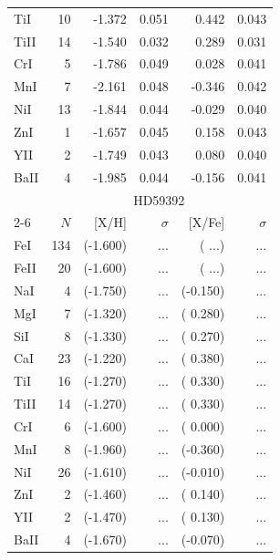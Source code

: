 \documentclass{aa}
\begin{document}
\begin{table}
\begin{tabular}{l*{5}{r}}
TiI  &     10&    -1.372&     0.051&     0.442&     0.043\\
TiII &     14&    -1.540&     0.032&     0.289&     0.031\\
CrI  &      5&    -1.786&     0.049&     0.028&     0.041\\
MnI  &      7&    -2.161&     0.048&    -0.346&     0.042\\
NiI  &     13&    -1.844&     0.044&    -0.029&     0.040\\
ZnI  &      1&    -1.657&     0.045&     0.158&     0.043\\
YII  &      2&    -1.749&     0.043&     0.080&     0.040\\
BaII &      4&    -1.985&     0.044&    -0.156&     0.041\\\hline\hline
     &                     \multicolumn{5}{c}{HD59392   }\\\cline{2-6}
     & $N$ & [{X}/{H}] & $\sigma$ & [{X}/{Fe}] & $\sigma$\\\hline
FeI  &    134&   (-1.600)&      ...&  (   ...)&       ...\\
FeII &     20&   (-1.600)&      ...&  (   ...)&       ...\\
NaI  &      4&   (-1.750)&      ...&  (-0.150)&       ...\\
MgI  &      7&   (-1.320)&      ...&  ( 0.280)&       ...\\
SiI  &      8&   (-1.330)&      ...&  ( 0.270)&       ...\\
CaI  &     23&   (-1.220)&      ...&  ( 0.380)&       ...\\
TiI  &     16&   (-1.270)&      ...&  ( 0.330)&       ...\\
TiII &     14&   (-1.270)&      ...&  ( 0.330)&       ...\\
CrI  &      6&   (-1.600)&      ...&  ( 0.000)&       ...\\
MnI  &      8&   (-1.960)&      ...&  (-0.360)&       ...\\
NiI  &     26&   (-1.610)&      ...&  (-0.010)&       ...\\
ZnI  &      2&   (-1.460)&      ...&  ( 0.140)&       ...\\
YII  &      2&   (-1.470)&      ...&  ( 0.130)&       ...\\
BaII &      4&   (-1.670)&      ...&  (-0.070)&       ...\\
\hline
\end{tabular}
\end{table}
\end{document}
